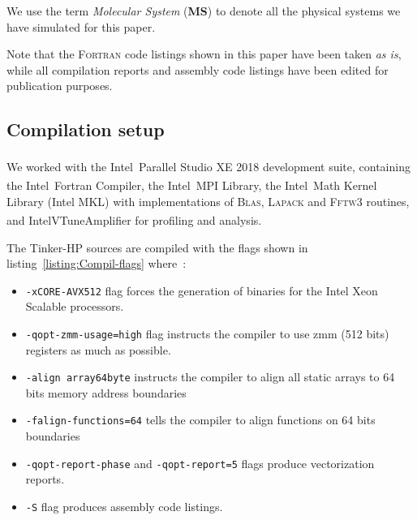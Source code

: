\documentclass[9pt,comparison]{livecoms}
\newcommand{\lv}{\Large\verb}
\newcommand{\rr}{\textsuperscript{\textregistered}}
\newcommand{\tm}{\textsuperscript{\texttrademark}}
\begin{document}
We use the term \emph{Molecular System} (\textbf{MS}) to denote all the physical systems we have simulated for this paper.

Note that the \textsc{Fortran} code listings shown in this paper have been taken \emph{as is}, while all compilation reports and assembly code listings have been edited for publication purposes.
\subsection{Compilation setup}
\hspace{\parindent} We worked with the Intel\rr\ Parallel Studio XE 2018 development suite\cite{intel-parallel-studio}, containing the Intel\rr\ Fortran Compiler, the Intel\rr\ MPI Library, the Intel\rr\ Math Kernel Library (Intel MKL) with implementations of \textsc{Blas}\cite{blas}, \textsc{Lapack}\cite{lapack} and \textsc{Fftw3}\cite{fftw3} routines, and Intel\rr VTune\tm  Amplifier for profiling and analysis.

The Tinker-HP sources are compiled with the flags shown in listing~\ref{listing:Compil-flags} where~:
\begin{itemize}
    \item {\color{codepurple}\lv|-xCORE-AVX512|} flag forces the generation of binaries for the Intel Xeon Scalable processors.
    \item {\color{codepurple}\lv|-qopt-zmm-usage=high|} flag instructs the compiler to use {\color{red}zmm} (512 bits) registers as much as possible.
    \item {\color{codepurple}\lv|-align array64byte|} instructs the compiler to align all static arrays to 64 bits memory address boundaries
    \item {\color{codepurple}\lv|-falign-functions=64|} tells the compiler to align functions on 64 bits boundaries
    \item {\color{codepurple}\lv|-qopt-report-phase|} and {\color{codepurple}\lv|-qopt-report=5|} flags produce vectorization reports.
    \item {\color{codepurple}\lv|-S|} flag produces assembly code listings.
\end{itemize}

\end{document}
